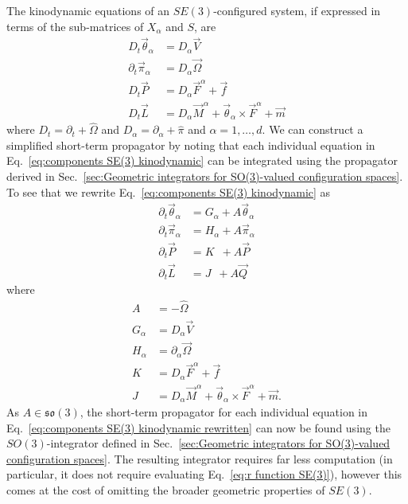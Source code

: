 \documentclass[withindex,glossary,techreport]{cam-thesis}
\begin{document}
\begin{appendices}
The kinodynamic equations of an $SE(3)$-configured system, if expressed in terms of the sub-matrices of $X_\alpha$ and $S$, are
\begin{subequations}  \label{eq:components SE(3) kinodynamic}
\begin{align}
D_t \vec{\theta}_\alpha & = D_\alpha \vec{V} \\
\partial_t \vec{\pi}_\alpha & = D_\alpha \vec{\Omega} \\
D_t \vec{P} & = D_\alpha \vec{F}^\alpha + \vec{f}  \\
D_t \vec{L} & = D_\alpha \vec{M}^\alpha + \vec{\theta}_\alpha \times \vec{F}^\alpha + \vec{m}
\end{align}
\end{subequations}
where $D_t = \partial_t + \hat{\Omega}$ and $D_\alpha = \partial_\alpha + \hat{\pi}$ and $\alpha = 1,\dots,d$. We can construct a simplified short-term propagator by noting that each individual equation in Eq.~\ref{eq:components SE(3) kinodynamic} can be integrated using the propagator derived in Sec.~\ref{sec:Geometric integrators for SO(3)-valued configuration spaces}. To see that we rewrite Eq.~\ref{eq:components SE(3) kinodynamic} as
\begin{subequations}  \label{eq:components SE(3) kinodynamic rewritten}
\begin{align}
\partial_t \vec{\theta}_\alpha & = G_\alpha + A \vec{\theta}_\alpha \\
\partial_t \vec{\pi}_\alpha & = H_\alpha + A \vec{\pi}_\alpha \\
\partial_t \vec{P}_{\phantom{\alpha}} & = K_{\phantom{\alpha}} + A \vec{P} \\
\partial_t \vec{L}_{\phantom{\alpha}} & = J_{\phantom{\alpha}} + A \vec{Q}
\end{align}
\end{subequations}
where
\begin{subequations} 
\begin{align}
A_{\phantom{\alpha}} & = - \hat{\Omega} \\
G_\alpha & = D_\alpha \vec{V} \\
H_\alpha & = \partial_\alpha \vec{\Omega} \\
K_{\phantom{\alpha}} & = D_\alpha \vec{F}^\alpha + \vec{f} \\
J_{\phantom{\alpha}} & = D_\alpha \vec{M}^\alpha + \vec{\theta}_\alpha \times \vec{F}^\alpha + \vec{m}.
\end{align}
\end{subequations}
As $A \in \mathfrak{so}(3)$, the short-term propagator for each individual equation in Eq.~\ref{eq:components SE(3) kinodynamic rewritten} can now be found using the $SO(3)$-integrator defined in Sec.~\ref{sec:Geometric integrators for SO(3)-valued configuration spaces}. The resulting integrator requires far less computation (in particular, it does not require evaluating Eq.~\ref{eq:r function SE(3)}), however this comes at the cost of omitting the broader geometric properties of $SE(3)$.



\end{appendices}
\end{document}
